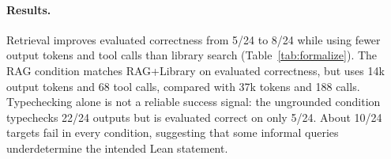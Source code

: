 \paragraph{Results.} Retrieval improves evaluated correctness from 5/24 to 8/24 while using fewer output tokens and tool calls than library search (Table~\ref{tab:formalize}). The RAG condition matches RAG+Library on evaluated correctness, but uses 14k output tokens and 68 tool calls, compared with 37k tokens and 188 calls. Typechecking alone is not a reliable success signal: the ungrounded condition typechecks 22/24 outputs but is evaluated correct on only 5/24. About 10/24 targets fail in every condition, suggesting that some informal queries underdetermine the intended Lean statement.